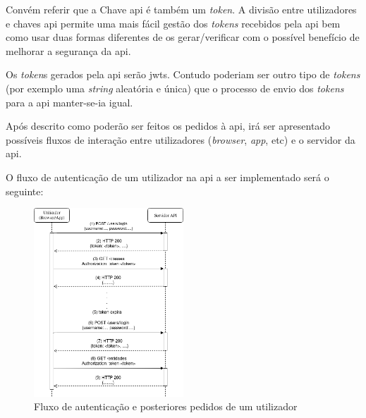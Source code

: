 Convém referir que a Chave \acrshort{api} é também um \textit{token}. A divisão entre utilizadores e chaves \acrshort{api} permite uma mais fácil gestão dos \textit{tokens} recebidos pela \acrshort{api} bem como usar duas formas diferentes de os gerar/verificar com o possível benefício de melhorar a segurança da \acrshort{api}.

Os \textit{token}s gerados pela \acrshort{api} serão \acrshort{jwt}s. Contudo poderiam ser outro tipo de \textit{tokens} (por exemplo uma \textit{string} aleatória e única) que o processo de envio dos \textit{tokens} para a \acrshort{api} manter-se-ia igual. 

Após descrito como poderão ser feitos os pedidos à \acrshort{api}, irá ser apresentado possíveis fluxos de interação entre utilizadores (\textit{browser}, \textit{app}, etc) e o servidor da \acrshort{api}. 

O fluxo de autenticação de um utilizador na \acrshort{api} a ser implementado será o seguinte:
\begin{figure}[H]
    \begin{center}
        \includegraphics[width=0.5\textwidth]{img/userAuth.png}
    \end{center}
    \caption{Fluxo de autenticação e posteriores pedidos de um utilizador}\label{fig:userAuth}
\end{figure}

